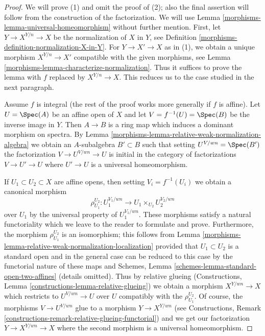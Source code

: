 \begin{proof}

We will prove (1) and omit the proof of (2); also the final assertion
will follow from the construction of the factorization. We will use
Lemma \ref{morphisms-lemma-universal-homeomorphism} without
further mention. First, let $Y \to X^{Y/n} \to X$ be the normalization
of $X$ in $Y$, see Definition \ref{morphisms-definition-normalization-X-in-Y}.
For $Y \to X' \to X$ as in (1), we obtain a unique morphism
$X^{Y/n} \to X'$ compatible with the given morphisms, see
Lemma \ref{morphisms-lemma-characterize-normalization}. Thus it suffices
to prove the lemma with $f$ replaced by $X^{Y/n} \to X$. This reduces
us to the case studied in the next paragraph.

\medskip\noindent
Assume $f$ is integral (the rest of the proof works more generally if
$f$ is affine). Let $U = \Spec(A)$ be an affine open of $X$ and let
$V = f^{-1}(U) = \Spec(B)$ be the inverse image in $Y$.
Then $A \to B$ is a ring map which induces a dominant morphism
on spectra. By Lemma \ref{morphisms-lemma-relative-weak-normalization-algebra}
we obtain an $A$-subalgebra $B' \subset B$ such that setting
$U^{V/wn} = \Spec(B')$ the factorization $V \to U^{V/wn} \to U$
is initial in the category of factorizations $V \to U' \to U$ where
$U' \to U$ is a universal homeomorphism.

\medskip\noindent
If $U_1 \subset U_2 \subset X$ are affine opens, then setting
$V_i = f^{-1}(U_i)$ we obtain a canonical morphism
$$
\rho_{U_1}^{U_2} : U_1^{V_1/wn} \to U_1 \times_{U_2} U_2^{V_2/wn}
$$
over $U_1$ by the universal property of $U_1^{V_1/wn}$. These morphisms satisfy
a natural functoriality which we leave to the reader to formulate and prove.
Furthermore, the morphism $\rho_{U_1}^{U_2}$
is an isomorphism; this follows from
Lemma \ref{morphisms-lemma-relative-weak-normalization-localization}
provided that $U_1 \subset U_2$ is a standard open
and in the general case can be reduced to this case
by the functorial nature of these maps and
Schemes, Lemma \ref{schemes-lemma-standard-open-two-affines}
(details omitted). Thus by relative glueing
(Constructions, Lemma \ref{constructions-lemma-relative-glueing})
we obtain a morphism $X^{Y/wn} \to X$ which restricts
to $U^{V/wn} \to U$ over $U$ compatibly with the $\rho_{U_1}^{U_2}$.
Of course, the morphisms $V \to U^{V/wn}$ glue to a morphism $Y \to X^{Y/wn}$
(see Constructions, Remark
\ref{constructions-remark-relative-glueing-functorial})
and we get our factorization $Y \to X^{Y/wn} \to X$ where the second morphism
is a universal homeomorphism.


\end{proof}
